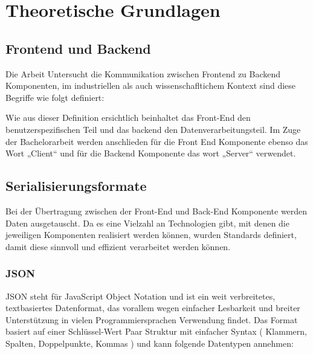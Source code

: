 \chapter{Theoretische Grundlagen}
\label{chap:intro}
\chapterstart

\section{Frontend und Backend}

Die Arbeit Untersucht die Kommunikation zwischen Frontend zu Backend Komponenten, im industriellen als auch wissenschafltichem Kontext sind diese Begriffe wie folgt definiert:

{\cite{awsfrontendbackend}}

Wie aus dieser Definition ersichtlich beinhaltet das Front-End den benutzerspezifischen Teil und das backend den Datenverarbeitungsteil. Im Zuge der Bachelorarbeit werden anschlieden für die Front End Komponente ebenso das Wort „Client“ und für die Backend Komponente das wort „Server“ verwendet.

\section{Serialisierungsformate}
Bei der Übertragung zwischen der Front-End und Back-End Komponente werden Daten ausgetauscht. Da es eine Vielzahl an Technologien gibt, mit denen die jeweiligen Komponenten realisiert werden können, wurden Standards definiert, damit diese sinnvoll und effizient verarbeitet werden können.

\subsection{JSON}
JSON steht für JavaScript Object Notation und ist ein weit verbreitetes, textbasiertes Datenformat, das vorallem wegen einfacher Lesbarkeit und breiter Unterstützung in vielen Programmiersprachen Verwendung findet. Das Format basiert auf einer Schlüssel-Wert Paar Struktur mit einfacher Syntax ( Klammern, Spalten, Doppelpunkte, Kommas ) und kann folgende Datentypen annehmen:

